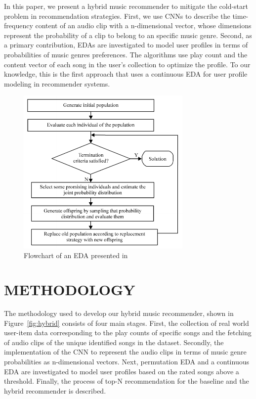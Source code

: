 \documentclass{article}
\begin{document}
In this paper, we present a hybrid music recommender to mitigate the cold-start problem in recommendation strategies. First, we use CNNs to describe the time-frequency content of an audio clip with a n-dimensional vector, whose dimensions represent the probability of a clip to belong to an specific music genre. Second, as a primary contribution, EDAs are investigated to model user profiles in terms of probabilities of music genres preferences. The algorithms use play count and the content vector of each song in the user's collection to optimize the profile. To our knowledge, this is the first approach that uses a continuous EDA for user profile modeling in recommender systems.

\begin{figure}[htb]
	
	\begin{minipage}[b]{1.0\linewidth}
		\centering
		\centerline{\includegraphics[width=8.5cm]{eda.png}}
	\end{minipage}
	\caption{Flowchart of an EDA presented in~\cite{Ding2015451}}
	\label{fig:eda}
\end{figure}



\section{METHODOLOGY}
\label{sec:format}

The methodology used to develop our hybrid music recommender, shown in Figure~\ref{fig:hybrid} consists of four main stages. First, the collection of real world user-item data corresponding to the play counts of specific songs and the fetching of audio clips of the unique identified songs in the dataset. Secondly, the implementation of the CNN to represent the audio clips in terms of music genre probabilities as n-dimensional vectors. Next, permutation EDA and a continuous EDA are investigated to model user profiles based on the rated songs above a threshold. Finally, the process of top-N recommendation for the baseline and the hybrid recommender is described.
\end{document}

